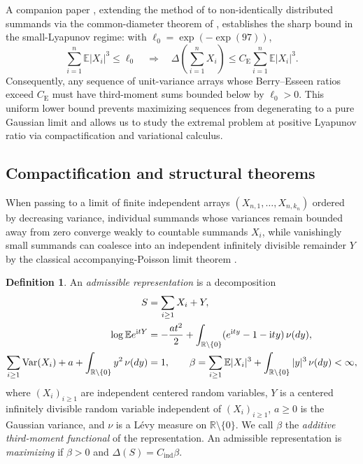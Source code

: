 \documentclass[11pt]{article}
\numberwithin{equation}{section}
\theoremstyle{definition}
\newtheorem{definition}[theorem]{Definition}
\DeclareMathOperator{\Var}{Var}
\newcommand{\E}{\mathbb E}
\newcommand{\R}{\mathbb R}
\newcommand{\ce}{C_{\mathrm E}}
\newcommand{\ci}{C_{\mathrm{ind}}}
\newcommand{\ii}{\mathrm i}
\begin{document}
A companion paper \citep[Theorem~1.1]{BellSmall2026}, extending the method of
\citet{HeCheng2026} to non-identically distributed summands via the
common-diameter theorem of \citet{BellFinite2026}, establishes the sharp
bound in the small-Lyapunov regime: with $\ell_0=\exp(-\exp(97))$,
\begin{equation}\label{eq:small-input}
 \sum_{i=1}^n\E|X_i|^3\le\ell_0
 \quad\Longrightarrow\quad
 \Delta\!\left(\sum_{i=1}^nX_i\right)\le\ce\sum_{i=1}^n\E|X_i|^3.
\end{equation}
Consequently, any sequence of unit-variance arrays whose Berry--Esseen ratios
exceed $\ce$ must have third-moment sums bounded below by $\ell_0>0$. This
uniform lower bound prevents maximizing sequences from degenerating to a
pure Gaussian limit and allows us to study the extremal problem at positive
Lyapunov ratio via compactification and variational calculus.

\subsection{Compactification and structural theorems}

When passing to a limit of finite independent arrays $(X_{n,1},\ldots,X_{n,k_n})$
ordered by decreasing variance, individual summands whose variances remain
bounded away from zero converge weakly to countable summands $X_i$, while
vanishingly small summands can coalesce into an independent infinitely
divisible remainder $Y$ by the classical accompanying-Poisson limit theorem
\citep{Levy1937}.

\begin{definition}\label{def:representation}
An \emph{admissible representation} is a decomposition
\begin{align}
 S&=\sum_{i\ge1}X_i+Y,\notag\\
 \log\E e^{\ii tY}
   &=-\frac{at^2}{2}
     +\int_{\R\setminus\{0\}}(e^{\ii ty}-1-\ii ty)\,\nu(dy),
                                                        \label{eq:LK}\\
 \sum_{i\ge1}\Var(X_i)+a+\int_{\R\setminus\{0\}} y^2\,\nu(dy)&=1,\qquad
 \beta=\sum_{i\ge1}\E|X_i|^3+\int_{\R\setminus\{0\}}|y|^3\,\nu(dy)<\infty,         \label{eq:profile-moments}
\end{align}
where $(X_i)_{i\ge1}$ are independent centered random variables, $Y$ is a
centered infinitely divisible random variable independent of $(X_i)_{i\ge1}$,
$a\ge0$ is the Gaussian variance, and $\nu$ is a L\'evy measure on
$\R\setminus\{0\}$. We call $\beta$ the \emph{additive third-moment
functional} of the representation. An admissible representation is
\emph{maximizing} if $\beta>0$ and $\Delta(S)=\ci\beta$.
\end{definition}
\end{document}
